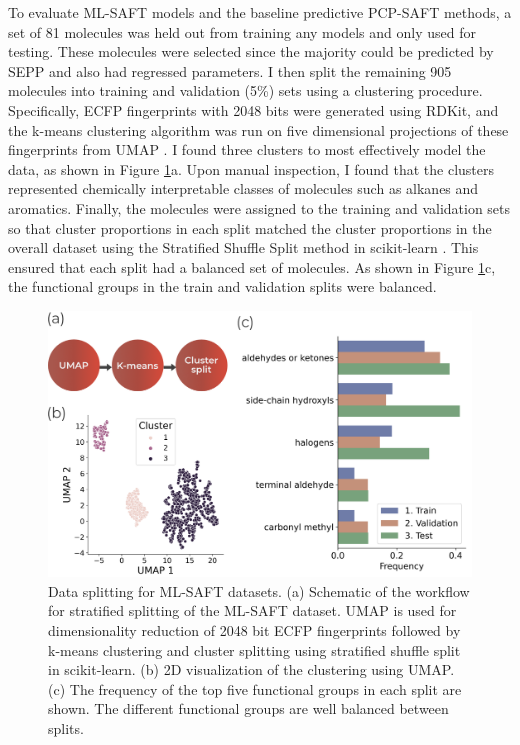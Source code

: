 To evaluate ML-SAFT models and the baseline predictive PCP-SAFT methods, a set of 81 molecules was held out from training any models and only used for testing. These molecules were selected since the majority could be predicted by SEPP and also had regressed parameters. I then split the remaining 905 molecules into training and validation (5\%) sets using a clustering procedure. Specifically, ECFP fingerprints with 2048 bits were generated using RDKit, and the k-means clustering algorithm\cite{MacQueen1967} was run on five dimensional projections of these fingerprints from UMAP \cite{McInnes2018}. I found three clusters to most effectively model the data, as shown in Figure \ref{fig:splitting}a. Upon manual inspection, I found that the clusters represented chemically interpretable classes of molecules such as alkanes and aromatics. Finally, the molecules were assigned to the training and validation sets so that cluster proportions in each split matched the cluster proportions in the overall dataset using the Stratified Shuffle Split method in scikit-learn \cite{scikit-learn}. This ensured that each split had a balanced set of molecules. As shown in Figure \ref{fig:splitting}c, the functional groups in the train and validation splits were balanced. 

\begin{figure}
    \centering
    \includegraphics[width=\textwidth]{gfx/Chapter08/cluster_split.png}
    \caption{Data splitting for ML-SAFT datasets. (a) Schematic of the workflow for stratified splitting of the ML-SAFT dataset. UMAP\cite{McInnes2018} is used for dimensionality reduction of 2048 bit ECFP fingerprints followed by k-means clustering\cite{MacQueen1967} and cluster splitting using stratified shuffle split in scikit-learn.\cite{scikit-learn} (b) 2D visualization of the clustering using UMAP. (c) The frequency of the top five functional groups in each split are shown. The different functional groups are well balanced between splits.}
    \label{fig:splitting}
\end{figure}

